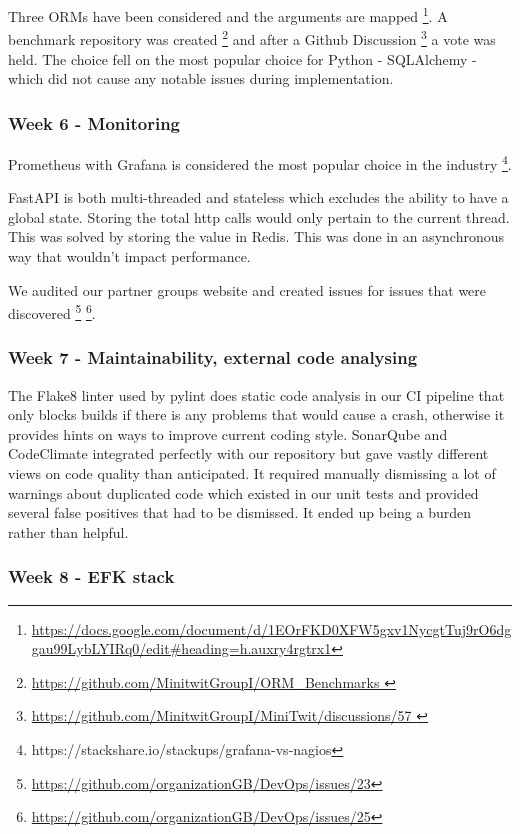 \documentclass{article}
\begin{document}
Three ORMs have been considered and the arguments are mapped \footnote{\url{https://docs.google.com/document/d/1EOrFKD0XFW5gxv1NycgtTuj9rO6dggau99LybLYIRq0/edit\#heading=h.auxry4rgtrx1}}. A benchmark repository was created \footnote{\url{https://github.com/MinitwitGroupI/ORM_Benchmarks }} and after a Github Discussion \footnote{\url{https://github.com/MinitwitGroupI/MiniTwit/discussions/57 }} a vote was held. The choice fell on the most popular choice for Python - SQLAlchemy - which did not cause any notable issues during implementation. 

\subsubsection{Week 6 - Monitoring }

Prometheus with Grafana is considered the most popular choice in the industry \footnote{https://stackshare.io/stackups/grafana-vs-nagios}. 


FastAPI is both multi-threaded and stateless which excludes the ability to have a global state. Storing the total http calls would only pertain to the current thread. This was solved by storing the value in Redis. This was done in an asynchronous way that wouldn't impact performance. 

We audited our partner groups website and created issues for issues that were discovered \footnote{\url{https://github.com/organizationGB/DevOps/issues/23}} \footnote{\url{https://github.com/organizationGB/DevOps/issues/25}}. 

\subsubsection{Week 7 - Maintainability, external code analysing }

The Flake8 linter used by pylint does static code analysis in our CI pipeline that only blocks builds if there is any problems that would cause a crash, otherwise it provides hints on ways to improve current coding style. SonarQube and CodeClimate integrated perfectly with our repository but gave vastly different views on code quality than anticipated. It required manually dismissing a lot of warnings about duplicated code which existed in our unit tests and provided several false positives that had to be dismissed. It ended up being a burden rather than helpful.

\subsubsection{Week 8 - EFK stack}
\end{document}
